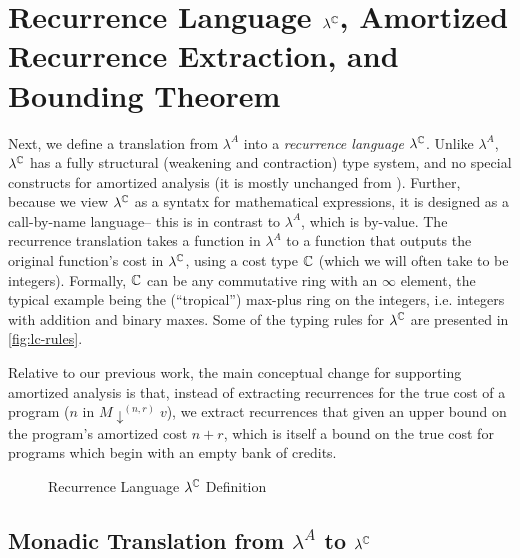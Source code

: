 \section{Recurrence Language \texorpdfstring{$\lambda^{\mathbb{C}}$}{}, Amortized Recurrence Extraction, and Bounding Theorem} \label{sec:cl}

Next, we define a translation from $\lambda^A$ into a \emph{recurrence
  language} $\lambda^{\mathbb{C}}$. Unlike $\lambda^A$, $\lambda^{\mathbb{C}}$ has
a fully structural (weakening and contraction) type system, and no
special constructs for amortized analysis (it is mostly unchanged from
\cite{danner-et-al:icfp15,hudson}). Further, because we view $\lambda^{\mathbb{C}}$
as a syntatx for mathematical expressions, it is designed as a call-by-name language--
this is in contrast to $\lambda^A$, which is by-value.
The recurrence translation takes a function in
$\lambda^A$ to a function that outputs the original function's cost in
$\lambda^{\mathbb{C}}$, using a cost type $\mathbb{C}$ (which we will often
take to be integers).  Formally, $\mathbb{C}$ can be any commutative ring
with an $\infty$ element, the typical example being the (``tropical'')
max-plus ring on the integers, i.e. integers with addition and binary
maxes.  Some of the typing rules for $\lambda^{\mathbb{C}}$ are presented in
\autoref{fig:lc-rules}.

Relative to our previous work, the main conceptual change for supporting
amortized analysis is that, instead of extracting recurrences for the
true cost of a program ($n$ in $M \downarrow^{(n,r)} v$), we extract
recurrences that given an upper bound on the program's amortized cost $n
+ r$, which is itself a bound on the true cost for programs which begin
with an empty bank of credits.

\begin{figure}[h]
  
  \vspace{-0.25in}
  \caption{Recurrence Language $\lambda^{\mathbb{C}}$ Definition}
  \label{fig:lc-rules}
\end{figure}

\subsection{Monadic Translation from \texorpdfstring{$\lambda^A$}{intermediate
language} to \texorpdfstring{$\lambda^{\mathbb{C}}$}{recurrence language}}\label{ssec:mt}
\label{sec:monadic-translation}

